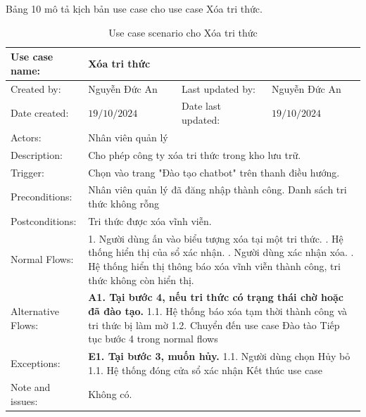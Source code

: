 Bảng 10 mô tả kịch bản use case cho use case Xóa tri thức.
\begin{table}[H]
	\centering
	\begin{tabular}{|l|l|l|l|} 
		\hline Use case name: & \multicolumn{3}{|l|}{Xóa tri thức} \\ 
		\hline Created by: & Nguyễn Đức An & Last updated by: & Nguyễn Đức An \\ 
		\hline Date created: & $19 / 10 / 2024$ & Date last updated: & $19 / 10 / 2024$\\ 
		\hline Actors: & \multicolumn{3}{|l|}{Nhân viên quản lý} \\ 
		\hline Description: & \multicolumn{3}{|p{12cm}|}{ Cho phép công ty xóa tri thức trong kho lưu trữ. } \\ 
		\hline Trigger: & \multicolumn{3}{|p{12cm}|}{ Chọn vào trang "Đào tạo chatbot" trên thanh điều hướng. } \\ 
		\hline Preconditions: & \multicolumn{3}{|p{12cm}|}{ 
			Nhân viên quản lý đã đăng nhập thành công. \newline 
			Danh sách tri thức không rỗng
		} \\ 
		\hline Postconditions: & \multicolumn{3}{|p{12cm}|}{ Tri thức được xóa vĩnh viễn. } \\ 
		\hline Normal Flows: & \multicolumn{3}{|p{12cm}|}{ 
			1. Người dùng ấn vào biểu tượng xóa tại một tri thức. \newline 
			2. Hệ thống hiển thị của sổ xác nhận. \newline 
            3. Người dùng xác nhận xóa. \newline 
			4. Hệ thống hiển thị thông báo xóa vĩnh viễn thành công, tri thức không còn hiển thị. 
		} \\ 
		\hline Alternative Flows: & \multicolumn{3}{|p{12cm}|}{ 
			\textbf{A1. Tại bước 4, nếu tri thức có trạng thái chờ hoặc đã đào tạo.} \newline 
			\hspace{0.5cm}1.1. Hệ thống báo xóa tạm thời thành công và tri thức bị làm mờ \newline
            \hspace{0.5cm}1.2. Chuyển đến use case Đào tào \newline
            \hspace{0.5cm}Tiếp tục bước 4 trong normal flows
		} \\ 
		\hline Exceptions: & \multicolumn{3}{|p{12cm}|}{
            \textbf{E1. Tại bước 3, muốn hủy.} \newline 
			\hspace{0.5cm}1.1. Người dùng chọn Hủy bỏ \newline
			\hspace{0.5cm}1.1. Hệ thống đóng cửa sổ xác nhận \newline
            \hspace{0.5cm}Kết thúc use case
        } \\ 
		\hline Note and issues: & \multicolumn{3}{|p{12cm}|}{ Không có. } \\ 
		\hline
	\end{tabular}
	\caption{Use case scenario cho Xóa tri thức}
\end{table}


